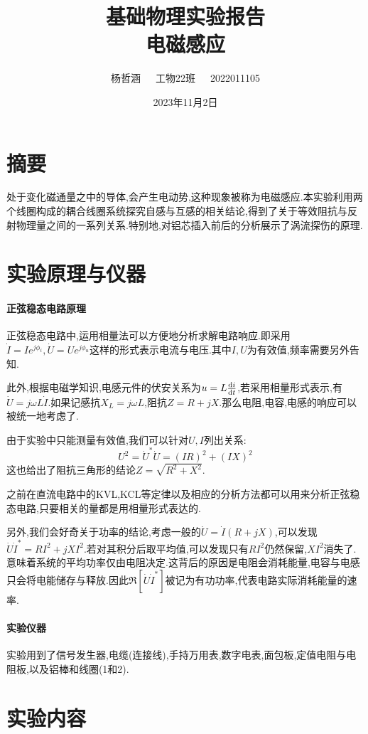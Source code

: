 \documentclass[UTF8,a4paper]{article}%
\title{\textbf{基础物理实验报告\\电磁感应}}
\author{杨哲涵~~~工物22班~~~2022011105}
\date{2023年11月2日}
\begin{document}
\maketitle
{}
\chead{}
\lfoot{}
\cfoot{\thepage}
\rfoot{}
\section*{摘要}
处于变化磁通量之中的导体,会产生电动势,这种现象被称为电磁感应.本实验利用两个线圈构成的耦合线圈系统探究自感与互感的相关结论,得到了关于等效阻抗与反射物理量之间的一系列关系.特别地,对铝芯插入前后的分析展示了涡流探伤的原理.
\section{实验原理与仪器}
\paragraph{正弦稳态电路原理}
正弦稳态电路中,运用相量法可以方便地分析求解电路响应.即采用$\dot{I}=Ie^{j\phi_i},\dot{U}=Ue^{j\phi_u}$这样的形式表示电流与电压.其中$I,U$为有效值,频率需要另外告知.

此外,根据电磁学知识,电感元件的伏安关系为$u=L\dv{i}{t}$,若采用相量形式表示,有$\dot{U}=j\omega L\dot{I}$.如果记感抗$X_L=j\omega L$,阻抗$Z=R+jX$.那么电阻,电容,电感的响应可以被统一地考虑了.

由于实验中只能测量有效值,我们可以针对$U,I$列出关系:
$$U^2=\dot{U}^*\dot{U}=(IR)^2+(IX)^2$$
这也给出了阻抗三角形的结论$Z=\sqrt{R^2+X^2}$.

之前在直流电路中的KVL,KCL等定律以及相应的分析方法都可以用来分析正弦稳态电路,只要相关的量都是用相量形式表达的.

另外,我们会好奇关于功率的结论,考虑一般的$\dot{U}=\dot{I}(R+jX)$,可以发现$\dot{U}\dot{I}^*=RI^2+jXI^2$.若对其积分后取平均值,可以发现只有$RI^2$仍然保留,$XI^2$消失了.意味着系统的平均功率仅由电阻决定.这背后的原因是电阻会消耗能量,电容与电感只会将电能储存与释放.因此$\Re[\dot{U}\dot{I}^*]$被记为有功功率,代表电路实际消耗能量的速率.
\paragraph{实验仪器}
实验用到了信号发生器,电缆(连接线),手持万用表,数字电表,面包板,定值电阻与电阻板,以及铝棒和线圈(1和2).
\section{实验内容}
\end{document}
